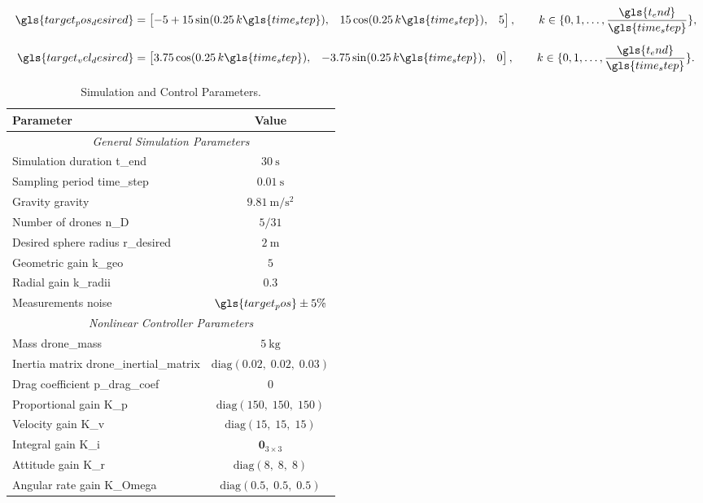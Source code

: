 \begin{equation}
    \begin{aligned}
        \gls{target_pos_desired} &=
        \begin{bmatrix}
            -5 + 15 \sin(0.25\,k \gls{time_step}), &
            15 \cos(0.25\,k \gls{time_step}), &
            5
        \end{bmatrix},
        \qquad
        k \in \{0,1,\ldots,\frac{\gls{t_end}}{\gls{time_step}}\}, \\[2mm]
        \gls{target_vel_desired} &=
        \begin{bmatrix}
            3.75 \cos(0.25\,k \gls{time_step}), &
            -3.75 \sin(0.25\,k \gls{time_step}), &
            0
        \end{bmatrix},
        \qquad
        k \in \{0,1,\ldots,\frac{\gls{t_end}}{\gls{time_step}}\}.
    \end{aligned}
    \label{eq.4:sim_target_motion}
\end{equation}

\begin{table}
    \centering
    \caption{Simulation and Control Parameters.}
    \label{tab.4:all_params}
    \begin{tabular}{l c}
    \hline
    \textbf{Parameter} & \textbf{Value} \\
    \hline
    \multicolumn{2}{c}{\textit{General Simulation Parameters}} \\
    \hline
    Simulation duration \gls{t_end} & $30~\mathrm{s}$ \\
    Sampling period \gls{time_step} & $0.01~\mathrm{s}$ \\
    Gravity \gls{gravity} & $9.81~\mathrm{m/s^2}$ \\
    Number of drones \gls{n_D} & $5/31$ \\
    Desired sphere radius \gls{r_desired} & $2~\mathrm{m}$ \\
    Geometric gain \gls{k_geo} & $5$ \\
    Radial gain \gls{k_radii} & $0.3$ \\
    Measurements noise & $\gls{target_pos} \pm 5\%$ \\
    \hline
    \multicolumn{2}{c}{\textit{Nonlinear Controller Parameters}} \\
    \hline
    Mass \gls{drone_mass} & $5~\mathrm{kg}$ \\
    Inertia matrix \gls{drone_inertial_matrix} & $\mathrm{diag}(0.02,\;0.02,\;0.03)$ \\
    Drag coefficient \gls{p_drag_coef} & $0$ \\
    Proportional gain \gls{K_p} & $\mathrm{diag}(150,\;150,\;150)$ \\
    Velocity gain \gls{K_v} & $\mathrm{diag}(15,\;15,\;15)$ \\
    Integral gain \gls{K_i} & $\mathbf{0}_{3\times3}$ \\
    Attitude gain \gls{K_r} & $\mathrm{diag}(8,\;8,\;8)$ \\
    Angular rate gain \gls{K_Omega} & $\mathrm{diag}(0.5,\;0.5,\;0.5)$ \\
    \hline
    \end{tabular}
\end{table}

